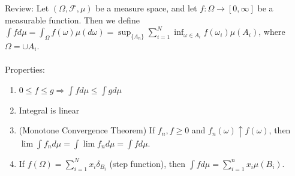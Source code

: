 \documentclass[12pt]{article}
\begin{document}
Review: Let $(\Omega, \mathcal{F},\mu)$ be a measure space, and let $f : \Omega \rightarrow [0, \infty]$ be a measurable function.  Then we define $\int f d \mu = \int_\Omega f (\omega) \mu(d \omega) = \sup_{\{A_n\}} \sum_{i=1}^N \inf_{\omega \in A_i} f (\omega_i) \mu(A_i)$, where $\Omega = \cup A_i$.
\\ \\
Properties:
\begin{enumerate}
\item $0 \le f \le g \Rightarrow \int f d \mu \le \int g d \mu$
\item Integral is linear
\item (Monotone Convergence Theorem) If $f_n, f \ge 0$ and $f_n(\omega) \uparrow f(\omega)$, then $\lim \int f_n d \mu = \int \lim f_n d \mu = \int f d \mu$.
\item If $f(\Omega) = \sum_{i=1}^N x_i \delta_{B_i}$ (step function), then $\int f d \mu = \sum_{i=1}^n x_i \mu(B_i)$.
\end{enumerate}
\end{document}
